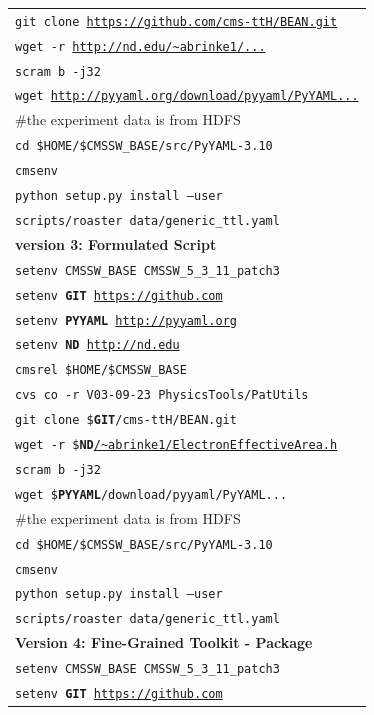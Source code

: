 \documentclass{acm_proc_article-sp}
\begin{document}
\begin{table}
\begin{tabular}{|l|}
        {\tt git clone \url{https://github.com/cms-ttH/BEAN.git}} \\
        {\tt wget -r \url{http://nd.edu/~abrinke1/...}} \\
        {\tt scram b -j32} \\
        {\tt wget \url{http://pyyaml.org/download/pyyaml/PyYAML...}}\\
        \#the experiment data is from HDFS \\
        {\tt cd \$HOME/\$CMSSW\_BASE/src/PyYAML-3.10}\\
        {\tt cmsenv}\\
        {\tt python setup.py install --user} \\
        {\tt scripts/roaster data/generic\_ttl.yaml} \\ 
        \hline
        {\bf version 3: Formulated Script} \\ \hline
        {\tt setenv CMSSW\_BASE CMSSW\_5\_3\_11\_patch3} \\
        {\tt setenv {\bf GIT} \url{https://github.com}} \\
        {\tt setenv {\bf PYYAML} \url{http://pyyaml.org}} \\
        {\tt setenv {\bf ND} \url{http://nd.edu}} \\
        {\tt cmsrel \$HOME/\$CMSSW\_BASE} \\
        {\tt cvs co -r V03-09-23 PhysicsTools/PatUtils} \\
        {\tt git clone \${\bf GIT}/cms-ttH/BEAN.git} \\
        {\tt wget -r \${\bf ND}\url{/~abrinke1/ElectronEffectiveArea.h}} \\
        {\tt scram b -j32} \\
        {\tt wget \${\bf PYYAML}/download/pyyaml/PyYAML...}\\
        \#the experiment data is from HDFS \\
        {\tt cd \$HOME/\$CMSSW\_BASE/src/PyYAML-3.10}\\
        {\tt cmsenv}\\
        {\tt python setup.py install --user} \\
        {\tt scripts/roaster data/generic\_ttl.yaml} \\ 
        \hline
       {\bf Version 4: Fine-Grained Toolkit - Package}\\ \hline
        {\tt setenv CMSSW\_BASE CMSSW\_5\_3\_11\_patch3} \\
        {\tt setenv {\bf GIT} \url{https://github.com}} \\

\end{tabular}
\end{table}
\end{document}

